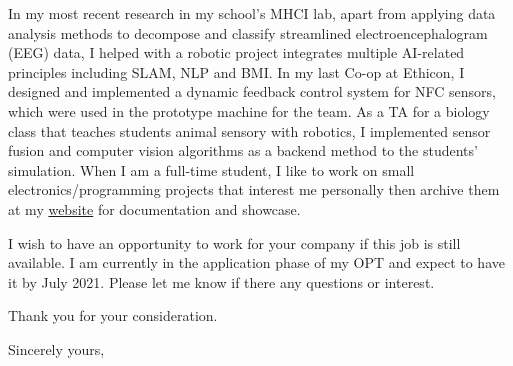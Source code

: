 \documentclass[11pt]{letter} %
\begin{document}
\begin{letter}
\par In my most recent research in my school's MHCI lab, apart from applying data analysis methods to decompose and classify streamlined electroencephalogram (EEG) data, I helped with a robotic project integrates multiple AI-related principles including SLAM, NLP and BMI.
In my last Co-op at Ethicon, I designed and implemented a dynamic feedback control system for NFC sensors, which were used in the prototype machine for the team.
As a TA for a biology class that teaches students animal sensory with robotics, I implemented sensor fusion and computer vision algorithms as a backend method to the students' simulation.
When I am a full-time student, I like to work on small electronics/programming projects that interest me personally then archive them at my \href{https://liu2z2.github.io/tags#project-ref}{website} for documentation and showcase.

\par I wish to have an opportunity to work for your company if this job is still available.
I am currently in the application phase of my OPT and expect to have it by July 2021.
Please let me know if there any questions or interest.

\par Thank you for your consideration.

\closing{Sincerely yours,}




\end{letter}
\end{document}
